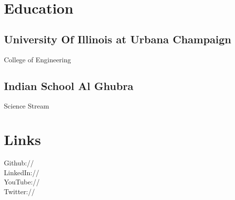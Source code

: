 \documentclass[]{deedy-resume-openfont}
\begin{document}
%
%
\lastupdated

%
%



%
%

\begin{minipage}[t]{0.28\textwidth} 


\section{Education} 

\subsection{University Of Illinois at Urbana Champaign}
College of Engineering \\
\sectionsep

\subsection{Indian School Al Ghubra}
Science Stream \\
\sectionsep


\section{Links} 
Github:// \href{https://github.com/pranaygp}{} \\
LinkedIn://  \href{https://www.linkedin.com/in/pranaygp}{} \\
YouTube://  \href{https://www.youtube.com/user/pranaypraksh}{} \\
Twitter://  \href{https://twitter.com/pranaygp}{}
\sectionsep


\end{minipage}
\end{document}
